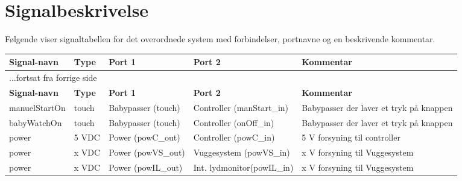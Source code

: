 

\section{Signalbeskrivelse} \label{overordnet:signalbeskrivelse}

Følgende viser  signaltabellen for det overordnede system  med forbindelser, portnavne og en beskrivende kommentar.

\begin{center}
\label{overordnet:signaltabel}
\begin{longtable}{|p{}|p{}|p{}|p{}|p{3cm}|}
\hline
\textbf{Signal-navn}	&\textbf{Type} 		&\textbf{Port 1} 	&\textbf{Port 2} 			&\textbf{Kommentar} \\ \hline
\endfirsthead
\multicolumn{5}{l}{...fortsat fra forrige side} \\ \hline 
\textbf{Signal-navn}	&\textbf{Type} 		&\textbf{Port 1} 	&\textbf{Port 2} 			&\textbf{Kommentar} \\ \hline
\endhead


manuelStartOn
&touch
&Babypasser \newline (touch)
&Controller \newline (manStart\_in)
&Babypasser der laver et tryk på knappen
\\\hline

babyWatchOn
&touch
&Babypasser \newline (touch)
&Controller \newline (onOff\_in)
&Babypasser der laver et tryk på knappen
\\\hline

power
&5 VDC
&Power \newline(powC\_out)
&Controller \newline(powC\_in)
&5 V forsyning til controller
\\\hline

power
&x VDC
&Power \newline(powVS\_out)
&Vuggesystem \newline(powVS\_in)
&x V forsyning til Vuggesystem
\\\hline

power
&x VDC
&Power \newline(powIL\_out)
&Int. lydmonitor\newline(powIL\_in)
&x V forsyning til Vuggesystem
\\\hline


\end{longtable}
\end{center}
